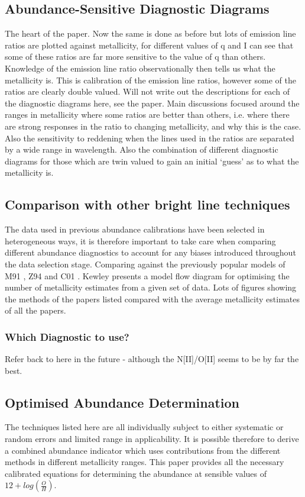 \documentclass{literature}
\begin{document}
\subsection{Abundance-Sensitive Diagnostic Diagrams}
The heart of the paper. Now the same is done as before but lots of emission line ratios are plotted against metallicity, for different values of q and I can see that some of these ratios are far more sensitive to the value of q than others. Knowledge of the emission line ratio observationally then tells us what the metallicity is. This is calibration of the emission line ratios, however some of the ratios are clearly double valued. Will not write out the descriptions for each of the diagnostic diagrams here, see the paper. 
Main discussions focused around the ranges in metallicity where some ratios are better than others, i.e. where there are strong responses in the ratio to changing metallicity, and why this is the case. Also the sensitivity to reddening when the lines used in the ratios are separated by a wide range in wavelength. Also the combination of different diagnostic diagrams for those which are twin valued to gain an initial `guess' as to what the metallicity is.

\subsection{Comparison with other bright line techniques}
The data used in previous abundance calibrations have been selected in heterogeneous ways, it is therefore important to take care when comparing different abundance diagnostics to account for any biases introduced throughout the data selection stage. Comparing against the previously popular models of M91 \citep{McGaugh_1991}, Z94 \citep{Zaritsky_1994} and C01 \citep{Charlot_2001}. Kewley presents a model flow diagram for optimising the number of metallicity estimates from a given set of data. Lots of figures showing the methods of the papers listed compared with the average metallicity estimates of all the papers.

\subsubsection{Which Diagnostic to use?} 
Refer back to here in the future - although the N[II]/O[II] seems to be by far the best.

\subsection{Optimised Abundance Determination}
The techniques listed here are all individually subject to either systematic or random errors and limited range in applicability. It is possible therefore to derive a combined abundance indicator which uses contributions from the different methods in different metallicity ranges. This paper provides all the necessary calibrated equations for determining the abundance at sensible values of $12 + log(\frac{O}{H})$. 
\end{document}
